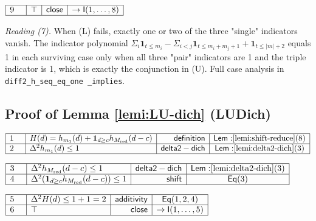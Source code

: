 \documentclass[11pt,reqno]{amsart}
\begin{document}
\nointerlineskip\noindent$%
\begin{array}{|m{0.5cm}|l|r|c|}
\hline
9 & \top & \mathsf{close} & \to\mathsf{I}(1,\dots,8) \\ \hline
\end{array}%
$

\medskip \noindent\textit{Reading (7).} When (L) fails, exactly one or two
of the three "single" indicators vanish. The indicator polynomial $\Sigma_{i}%
\mathbf{1}_{t\le m_{i}}-\Sigma_{i<j}\mathbf{1}_{t\le m_{i}+m_{j}+1}+\mathbf{1%
}_{t\le|m|+2}$ equals 1 in each surviving case only when all three "pair"
indicators are 1 and the triple indicator is 1, which is exactly the
conjunction in (U). Full case analysis in \texttt{diff2\_h\_seq\_eq\_one%
\_implies}.

\medskip


\subsection*{Proof of Lemma \protect\ref{lemi:LU-dich} (\textsf{LUDich})}

\noindent$%
\begin{array}{|m{0.5cm}|l|r|c|}
\hline
1 & H(d)=h_{m_{1}}(d)+\mathbf{1}_{d\ge c}h_{M_{\mathrm{red}}}(d-c) & \mathsf{%
definition} & \mathsf{Lem:}\ref{lemi:shift-reduce}(8) \\ \hline
2 & \Delta^{2}h_{m_{1}}(d)\le1 & \mathsf{delta2-dich} & \mathsf{Lem:}\ref%
{lemi:delta2-dich}(3) \\ \hline
\end{array}%
$

\nointerlineskip\noindent$%
\begin{array}{|m{0.5cm}|l|r|c|}
\hline
3 & \Delta^{2}h_{M_{\mathrm{red}}}(d-c)\le1 & \mathsf{delta2-dich} & \mathsf{%
Lem:}\ref{lemi:delta2-dich}(3) \\ \hline
4 & \Delta^{2}(\mathbf{1}_{d\ge c}h_{M_{\mathrm{red}}}(d-c))\le1 & \mathsf{%
shift} & \mathsf{Eq}(3) \\ \hline
\end{array}%
$

\nointerlineskip\noindent$%
\begin{array}{|m{0.5cm}|l|r|c|}
\hline
5 & \Delta^{2}H(d)\le1+1=2 & \mathsf{additivity} & \mathsf{Eq}(1,2,4) \\ 
\hline
6 & \top & \mathsf{close} & \to\mathsf{I}(1,\dots,5) \\ \hline
\end{array}%
$
\end{document}
